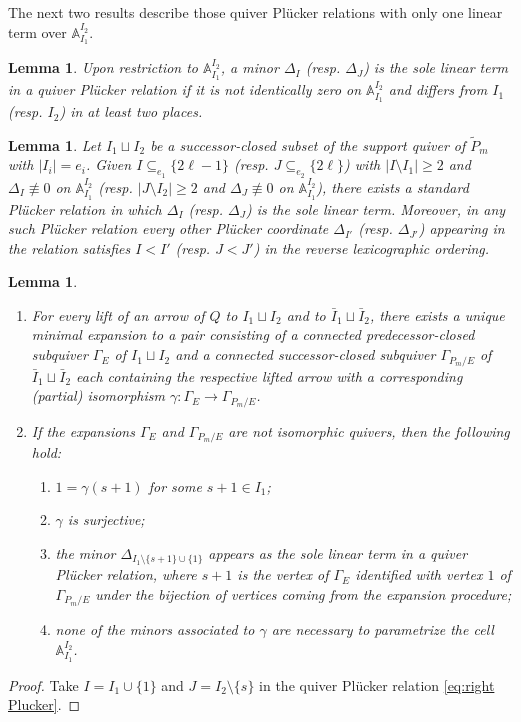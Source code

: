 \documentclass{amsart}
\newtheorem{lemma}[theorem]{Lemma}
\numberwithin{equation}{section}
\renewcommand{\AA}{\mathbb{A}}
\begin{document}
  The next two results describe those quiver Pl\"ucker relations with only one linear term over $\AA_{I_1}^{I_2}$.
  \begin{lemma}
    Upon restriction to $\AA_{I_1}^{I_2}$, a minor $\Delta_I$ (resp. $\Delta_J$) is the sole linear term in a quiver Pl\"ucker relation if it is not identically zero on $\AA_{I_1}^{I_2}$ and differs from $I_1$ (resp. $I_2$) in at least two places.
  \end{lemma}

  \begin{lemma}
    Let $I_1\sqcup I_2$ be a successor-closed subset of the support quiver of $\tilde P_m$ with $|I_i|=e_i$.
    Given $I \subseteq_{e_1} \{2\ell-1\}$ (resp. $J \subseteq_{e_2} \{2\ell\}$) with $|I\setminus I_1|\ge2$ and $\Delta_I\not\equiv 0$ on $\AA_{I_1}^{I_2}$ (resp. $|J\setminus I_2|\ge 2$ and $\Delta_J\not\equiv 0$ on $\AA_{I_1}^{I_2}$), there exists a standard Pl\"ucker relation in which $\Delta_I$ (resp. $\Delta_J$) is the sole linear term.
    Moreover, in any such Pl\"ucker relation every other Pl\"ucker coordinate $\Delta_{I'}$ (resp. $\Delta_{J'}$) appearing in the relation satisfies $I<I'$ (resp. $J<J'$) in the reverse lexicographic ordering.
  \end{lemma}
  \begin{lemma}
    \mbox{}
    \begin{enumerate}
      \item For every lift of an arrow of $Q$ to $I_1\sqcup I_2$ and to $\bar{I}_1\sqcup \bar{I}_2$, there exists a unique minimal expansion to a pair consisting of a connected predecessor-closed subquiver $\Gamma_E$ of $I_1\sqcup I_2$ and a connected successor-closed subquiver $\Gamma_{P_m/E}$ of $\bar{I}_1\sqcup \bar{I}_2$ each containing the respective lifted arrow with a corresponding (partial) isomorphism $\gamma:\Gamma_E\to\Gamma_{P_m/E}$.
      \item If the expansions $\Gamma_E$ and $\Gamma_{P_m/E}$ are not isomorphic quivers, then the following hold:
        \begin{enumerate}
          \item $1=\gamma(s+1)$ for some $s+1\in I_1$;
          \item $\gamma$ is surjective;
          \item the minor $\Delta_{I_1\setminus\{s+1\}\cup\{1\}}$ appears as the sole linear term in a quiver Pl\"ucker relation, where $s+1$ is the vertex of $\Gamma_E$ identified with vertex $1$ of $\Gamma_{P_m/E}$ under the bijection of vertices coming from the expansion procedure;
          \item none of the minors associated to $\gamma$ are necessary to parametrize the cell $\AA_{I_1}^{I_2}$.
        \end{enumerate}
    \end{enumerate}
  \end{lemma}
  \begin{proof}
    Take $I=I_1\cup\{1\}$ and $J=I_2\setminus\{s\}$ in the quiver Pl\"ucker relation \eqref{eq:right Plucker}.
  \end{proof}
\end{document}
